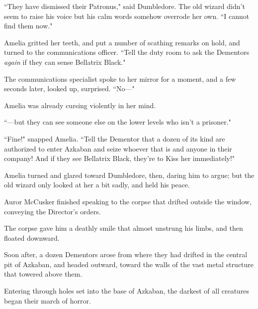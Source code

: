 ``They have dismissed their Patronus," said Dumbledore. The old wizard didn't seem to raise his voice but his calm words somehow overrode her own. ``I cannot find them now."

Amelia gritted her teeth, and put a number of scathing remarks on hold, and turned to the communications officer. ``Tell the duty room to ask the Dementors \emph{again} if they can sense Bellatrix Black."

The communications specialist spoke to her mirror for a moment, and a few seconds later, looked up, surprised. ``No---"

Amelia was already cursing violently in her mind.

``---but they can see someone else on the lower levels who isn't a prisoner."

``Fine!" snapped Amelia. ``Tell the Dementor that a dozen of its kind are authorized to enter Azkaban and seize whoever that is and anyone in their company! And if they see Bellatrix Black, they're to Kiss her immediately!"

Amelia turned and glared toward Dumbledore, then, daring him to argue; but the old wizard only looked at her a bit sadly, and held his peace.

\later

Auror McCusker finished speaking to the corpse that drifted outside the window, conveying the Director's orders.

The corpse gave him a deathly smile that almost unstrung his limbs, and then floated downward.

Soon after, a dozen Dementors arose from where they had drifted in the central pit of Azkaban, and headed outward, toward the walls of the vast metal structure that towered above them.

Entering through holes set into the base of Azkaban, the darkest of all creatures began their march of horror.

